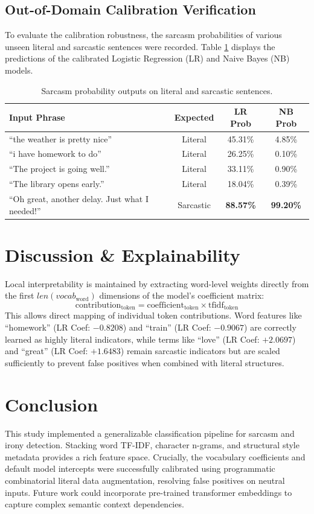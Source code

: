 \documentclass[11pt,a4paper]{article}
\begin{document}
\subsection{Out-of-Domain Calibration Verification}
To evaluate the calibration robustness, the sarcasm probabilities of various unseen literal and sarcastic sentences were recorded. Table \ref{tab:diagnostics} displays the predictions of the calibrated Logistic Regression (LR) and Naive Bayes (NB) models.

\begin{table}[h]
\centering
\begin{tabular}{lccc}
\toprule
\textbf{Input Phrase} & \textbf{Expected} & \textbf{LR Prob} & \textbf{NB Prob} \\
\midrule
``the weather is pretty nice'' & Literal & 45.31\% & 4.85\% \\
``i have homework to do'' & Literal & 26.25\% & 0.10\% \\
``The project is going well.'' & Literal & 33.11\% & 0.90\% \\
``The library opens early.'' & Literal & 18.04\% & 0.39\% \\
``Oh great, another delay. Just what I needed!'' & Sarcastic & \textbf{88.57\%} & \textbf{99.20\%} \\
\bottomrule
\end{tabular}
\caption{Sarcasm probability outputs on literal and sarcastic sentences.}
\label{tab:diagnostics}
\end{table}

\section{Discussion \& Explainability}
Local interpretability is maintained by extracting word-level weights directly from the first $len(vocab_{\text{word}})$ dimensions of the model's coefficient matrix:
\begin{equation}
\text{contribution}_{\text{token}} = \text{coefficient}_{\text{token}} \times \text{tfidf}_{\text{token}}
\end{equation}
This allows direct mapping of individual token contributions. Word features like ``homework'' (LR Coef: $-0.8208$) and ``train'' (LR Coef: $-0.9067$) are correctly learned as highly literal indicators, while terms like ``love'' (LR Coef: $+2.0697$) and ``great'' (LR Coef: $+1.6483$) remain sarcastic indicators but are scaled sufficiently to prevent false positives when combined with literal structures.

\section{Conclusion}
This study implemented a generalizable classification pipeline for sarcasm and irony detection. Stacking word TF-IDF, character n-grams, and structural style metadata provides a rich feature space. Crucially, the vocabulary coefficients and default model intercepts were successfully calibrated using programmatic combinatorial literal data augmentation, resolving false positives on neutral inputs. Future work could incorporate pre-trained transformer embeddings to capture complex semantic context dependencies.
\end{document}
